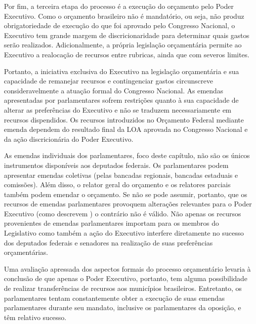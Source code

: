 Por fim, a terceira etapa do processo é a execução do orçamento pelo Poder Executivo. Como o orçamento brasileiro não é mandatório, ou seja, não produz obrigatoriedade de execução do que foi aprovado pelo Congresso Nacional, o Executivo tem grande margem de discricionaridade para determinar quais gastos serão realizados. Adicionalmente, a própria legislação orçamentária permite ao Executivo a realocação de recursos entre rubricas, ainda que com severos limites. 

Portanto, a iniciativa exclusiva do Executivo na legislação orçamentária e sua capacidade de remanejar recursos e contingenciar gastos circunscreve consideravelmente a atuação formal do Congresso Nacional. As emendas apresentadas por parlamentares sofrem restrições quanto à sua capacidade de alterar as preferências do Executivo e não se traduzem necessariamente em recursos dispendidos. Os recursos introduzidos no Orçamento Federal mediante emenda dependem do resultado final da LOA aprovada no Congresso Nacional e da ação discricionária do Poder Executivo.

As emendas individuais dos parlamentares, foco deste capítulo, não são os únicos instrumentos disponíveis aos deputados federais. Os parlamentares podem apresentar emendas coletivas (pelas bancadas regionais, bancadas estaduais e comissões). Além disso, o relator geral do orçamento e os relatores parciais também podem emendar o orçamento. %
Se não se pode assumir, portanto, que os recursos de emendas parlamentares provoquem alterações relevantes para o Poder Executivo (como descrevem \citealp*{Figueiredo2008}) o contrário não é válido. Não apenas os recursos provenientes de emendas parlamentares importam para os membros do Legislativo como também a ação do Executivo interfere diretamente no sucesso dos deputados federais e senadores na realização de suas preferências orçamentárias.

Uma avaliação apressada dos aspectos formais do processo orçamentário levaria à conclusão de que apenas o Poder Executivo, portanto, tem alguma possibilidade de realizar transferências de recursos aos municípios brasileiros. Entretanto, os parlamentares tentam constantemente obter a execução de suas emendas parlamentares durante seu mandato, inclusive os parlamentares da oposição, e têm relativo sucesso.

